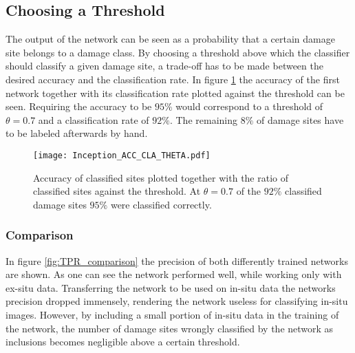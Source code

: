 \subsection{Choosing a Threshold}
The output of the network can be seen as a probability that a certain damage site belongs to a damage class. By choosing a threshold above which the classifier should classify a given damage site, a trade-off has to be made between the desired accuracy and the classification rate. In figure \ref{fig:InceptionACC_EFF_THETA} the accuracy of the first network together with its classification rate plotted against the threshold can be seen. Requiring the accuracy to be $95\%$ would correspond to a threshold of $\theta = 0.7$ and a classification rate of $92\%$. The remaining $8\%$ of damage sites have to be labeled afterwards by hand. 
%
%
%
\begin{figure}
  \texttt{[image: Inception\_ACC\_CLA\_THETA.pdf]}
\caption{Accuracy of classified sites plotted together with the ratio of classified sites against the threshold. At $\theta=0.7$ of the $92\%$ classified damage sites $95\%$ were classified correctly.}
\label{fig:InceptionACC_EFF_THETA}
\end{figure}

\subsubsection{Comparison}
In figure \ref{fig:TPR_comparison} the precision of both differently trained networks are shown. As one can see the network performed well, while working only with ex-situ data. Transferring the network to be used on in-situ data the networks precision dropped immensely, rendering the network useless for classifying in-situ images. However, by including a small portion of in-situ data in the training of the network, the number of damage sites wrongly classified by the network as inclusions becomes negligible above a certain threshold. 

